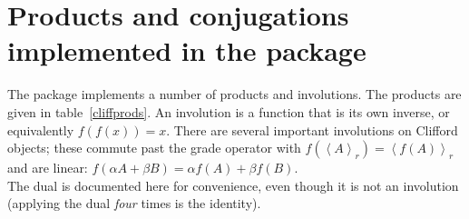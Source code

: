\documentclass{birkjour}
\theoremstyle{definition}
\theoremstyle{remark}
\numberwithin{equation}{section}
\begin{document}



\appendix
\section{Products and conjugations implemented in the package}


The package implements a number of products and involutions.  The
products are given in table~\ref{cliffprods}.
  An involution is a function that is its own inverse, or
  equivalently ${f(f(x))=x}$.  There are several important
  involutions on Clifford objects; these commute past the grade operator
  with ${f(\left\langle A\right\rangle_r)=\left\langle
  f(A)\right\rangle_r}$ and are linear: ${f(\alpha A+\beta
  B)=\alpha f(A)+\beta f(B)}$.\\
  The dual is documented here for convenience, even though it is
  not an involution (applying the dual \emph{four} times is the
  identity).
\end{document}
